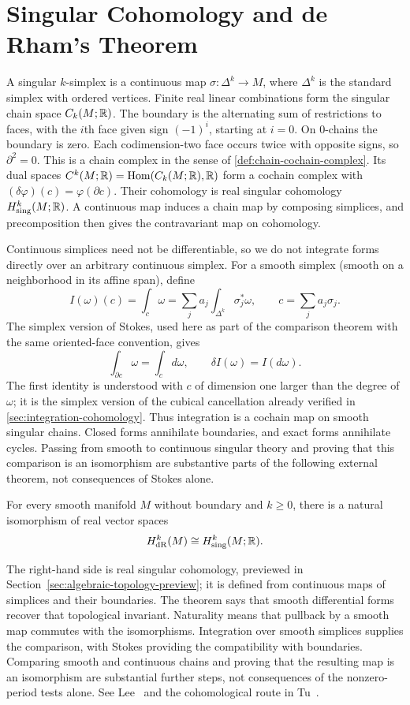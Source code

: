 \section{Singular Cohomology and de Rham's Theorem}
\label{sec:de-rham-comparison}
A singular $k$-simplex is a continuous map $\sigma:\Delta^k\to M$,
where $\Delta^k$ is the standard simplex with ordered vertices. Finite
real linear combinations form the singular chain space $C_k(M;\mathbb{R})$.
The boundary is the alternating sum of restrictions to faces, with the
$i$th face given sign $(-1)^i$, starting at $i=0$. On $0$-chains the
boundary is zero. Each codimension-two
face occurs twice with opposite signs, so $\partial^2=0$.
This is a chain complex in the sense of \cref{def:chain-cochain-complex}.
Its dual spaces $C^k(M;\mathbb{R})=\operatorname{Hom}(C_k(M;\mathbb{R}),\mathbb{R})$ form
a cochain complex with $(\delta\varphi)(c)=\varphi(\partial c)$.
Their cohomology is real singular cohomology $H_{\mathrm{sing}}^k(M;\mathbb{R})$.
A continuous map induces a chain map by composing simplices, and
precomposition then gives the contravariant map on cohomology.

Continuous simplices need not be differentiable, so we do not integrate
forms directly over an arbitrary continuous simplex. For a smooth simplex
(smooth on a neighborhood in its affine span), define
\[
I(\omega)(c)=\int_c\omega
=\sum_j a_j\int_{\Delta^k}\sigma_j^*\omega,
\qquad c=\sum_j a_j\sigma_j.
\]
The simplex version of Stokes, used here as part of the comparison
theorem with the same oriented-face convention, gives
\[
\int_{\partial c}\omega=\int_c d\omega,
\qquad \delta I(\omega)=I(d\omega).
\]
The first identity is understood with $c$ of dimension one larger than
the degree of $\omega$; it is the simplex version of the cubical
cancellation already verified in \cref{sec:integration-cohomology}.
Thus integration is a cochain map on smooth singular chains.
Closed forms annihilate boundaries, and exact forms annihilate cycles.
Passing from smooth to continuous singular theory and proving that this
comparison is an isomorphism are substantive parts of the following
external theorem, not consequences of Stokes alone.


\begin{theorem}\label{thm:de-rham-comparison}
For every smooth manifold $M$ without boundary and $k\geq0$, there is a
natural isomorphism of real vector spaces
\[
H_{\mathrm{dR}}^k(M)\cong H_{\mathrm{sing}}^k(M;\mathbb{R}).
\]
\end{theorem}
The right-hand side is real singular cohomology, previewed in
Section~\ref{sec:algebraic-topology-preview}; it is defined from continuous
maps of simplices and their boundaries. The theorem says that smooth
differential forms recover that topological invariant. Naturality means
that pullback by a smooth map commutes with the isomorphisms. Integration
over smooth simplices supplies the comparison, with Stokes providing the
compatibility with boundaries. Comparing smooth and continuous chains and
proving that the resulting map is an isomorphism are substantial further
steps, not consequences of the nonzero-period tests alone. See
Lee~\cite[Theorem 18.14]{lee-smooth} and the cohomological route in
Tu~\cite[\S\S24--29]{tu-manifolds}.

